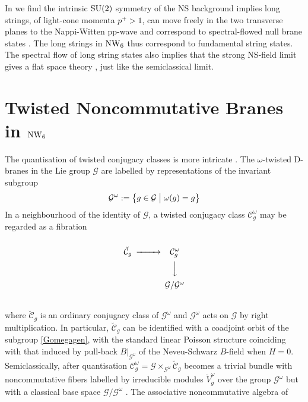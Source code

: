 In \cite{Halliday:2005zt} we find the intrinsic ${\rm SU}(2)$ symmetry of the NS
background implies long strings, of light-cone momenta $p^+>1$, can move freely
in the two transverse planes to the Nappi-Witten pp-wave and correspond to
spectral-flowed null brane states \cite{BAKZ1}. The long strings in $\operatorname{NW}_6$ thus
correspond to fundamental string states. The spectral flow of long string states
also implies that the strong NS-field limit gives a flat space theory
\cite{DAK1}, just like the semiclassical limit.

\section{Twisted Noncommutative Branes in $\operatorname{NW}_6$}
\label{TwistedNCBranes}
The quantisation of twisted conjugacy classes is more intricate \cite{AFQS1}.
The $\omega$-twisted D-branes in the Lie group $\mathcal{G}$ are labelled by
representations of the invariant subgroup
\begin{equation}
  \label{Gomegagen}
  \mathcal{G}^\omega:=\bigl\{g\in\mathcal{G} \bigm| \omega(g)=g
  \bigr\}
\end{equation}
In a neighbourhood of the identity of $\mathcal G$, a twisted conjugacy class
$\mathcal{C}_g^\omega$ may be regarded as a fibration
\begin{equation}
  \label{conjfibre}
  \begin{CD}
   @.\\
    \breve{\mathcal C}_g        @>>> \mathcal{C}_g^\omega\\
    @.    @VVV\\ @.
     \mathcal{G} / \mathcal{G}^\omega  \\
   @.
  \end{CD}
\end{equation}
where $\breve{\mathcal C}_g$ is an ordinary conjugacy class of
$\mathcal{G}^\omega$ and $\mathcal{G}^\omega$ acts on $\mathcal{G}$ by right
multiplication. In particular, $\breve{\mathcal C}_g$ can be identified with a
coadjoint orbit of the subgroup \eqref{Gomegagen}, with the standard linear
Poisson structure coinciding with that induced by pull-back
$B|_{\mathcal{G}^\omega}$ of the Neveu-Schwarz $B$-field when $H=0$.
Semiclassically, after quantisation $\mathcal{C}_g^\omega=\mathcal{G}
\times_{\mathcal{G}^\omega}\breve{\mathcal C}_g$ becomes a trivial bundle with
noncommutative fibers labelled by irreducible modules $\breve{V}_g^\omega$ over
the group $\mathcal{G}^\omega$ but with a classical base space $\mathcal{G} /
\mathcal{G}^\omega$ \cite{AFQS1}. The associative noncommutative algebra of
